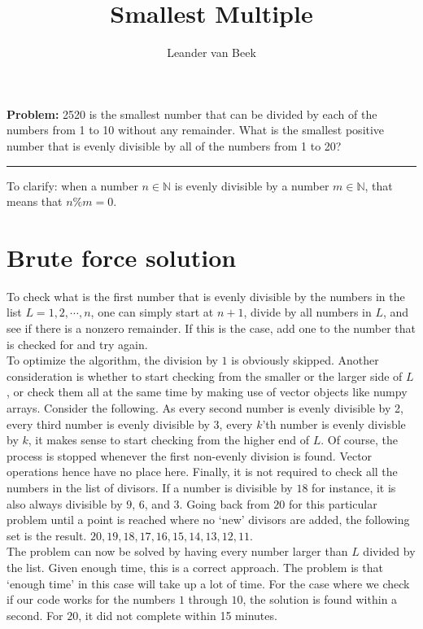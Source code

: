 \documentclass[10pt,a4paper]{article}
\author{Leander van Beek}
\title{Smallest Multiple}
\begin{document}
\maketitle

\textbf{Problem:} 2520 is the smallest number that can be divided by each of the numbers from 1 to 10 without any remainder. What is the smallest positive number that is evenly divisible by all of the numbers from 1 to 20?

\vspace{0.5cm}
\hrule
\vspace{0.5cm}

To clarify: when a number $n \in \mathds{N}$ is evenly divisible by a number $m \in \mathds{N}$, that means that $n\%m = 0$.\\

\section{Brute force solution}
To check what is the first number that is evenly divisible by the numbers in the list $L = {1, 2, \cdots, n}$, one can simply start at $n+1$, divide by all numbers in $L$, and see if there is a nonzero remainder. If this is the case, add one to the number that is checked for and try again.\\

To optimize the algorithm, the division by $1$ is obviously skipped. Another consideration is whether to start checking from the smaller or the larger side of $L$, or check them all at the same time by making use of vector objects like numpy arrays. Consider the following. As every second number is evenly divisible by 2, every third number is evenly divisible by 3, every $k$'th number is evenly divisble by $k$, it makes sense to start checking from the higher end of $L$. Of course, the process is stopped whenever the first non-evenly division is found. Vector operations hence have no place here. Finally, it is not required to check all the numbers in the list of divisors. If a number is divisible by $18$ for instance, it is also always divisible by $9$, $6$, and $3$. Going back from $20$ for this particular problem until a point is reached where no `new' divisors are added, the following set is the result. ${20, 19, 18, 17, 16, 15, 14, 13, 12, 11}$.\\

The problem can now be solved by having every number larger than $L$ divided by the list. Given enough time, this is a correct approach. The problem is that `enough time' in this case will take up a lot of time. For the case where we check if our code works for the numbers $1$ through $10$, the solution is found within a second. For $20$, it did not complete within 15 minutes.
\end{document}
